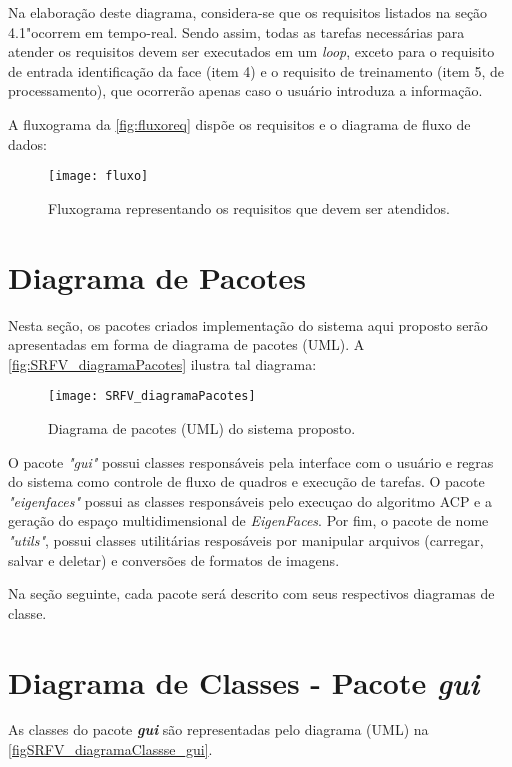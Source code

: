 Na elaboração deste diagrama, considera-se que os requisitos listados na seção 4.1"ocorrem em tempo-real. Sendo assim, todas as tarefas necessárias para atender os requisitos devem ser executados em um \textit{loop}, exceto para o requisito de entrada identificação da face (item 4) e o requisito de treinamento (item 5, de processamento), que ocorrerão apenas caso o usuário introduza a informação.

A fluxograma da \autoref{fig:fluxoreq} dispõe os requisitos e o diagrama de fluxo de dados:


\begin{figure}[h]
	\centering
	\texttt{[image: fluxo]}
	\caption{Fluxograma representando os requisitos que devem ser atendidos.}
	\label{fig:fluxoreq}
\end{figure}


\section{Diagrama de Pacotes}\label{sec:diagpacs}
Nesta seção, os pacotes criados implementação do sistema aqui proposto serão apresentadas em forma de diagrama de pacotes (UML). A \autoref{fig:SRFV_diagramaPacotes} ilustra tal diagrama:

\begin{figure}[h]
	\centering
	\texttt{[image: SRFV\_diagramaPacotes]}
	\caption{Diagrama de pacotes (UML) do sistema proposto.}
	\label{fig:SRFV_diagramaPacotes}
\end{figure}

O pacote \textit{"gui"} possui classes responsáveis pela interface com o usuário e regras do sistema como controle de fluxo de quadros e execução de tarefas. O pacote \textit{"eigenfaces"} possui as classes responsáveis pelo execuçao do algoritmo ACP e a geração do espaço multidimensional de \textit{EigenFaces}. Por fim, o pacote de nome \textit{"utils"}, possui classes utilitárias resposáveis por manipular arquivos (carregar, salvar e deletar) e conversões de formatos de imagens. 

Na seção seguinte, cada pacote será descrito com seus respectivos diagramas de classe.

\section{Diagrama de Classes - Pacote \textit{\textbf{gui}}}\label{sec:diagclasses}
As classes do pacote \textbf{\textit{gui}} são representadas pelo diagrama (UML) na \autoref{figSRFV_diagramaClassse_gui}.

